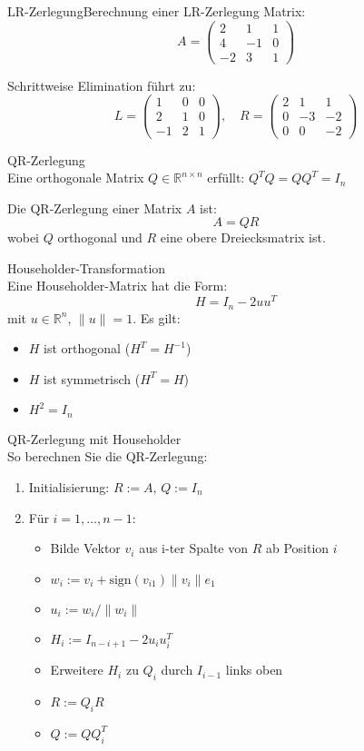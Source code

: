 \begin{example2}{LR-Zerlegung}{Berechnung einer LR-Zerlegung}
Matrix:
$$A = \begin{pmatrix}
2 & 1 & 1\\
4 & -1 & 0\\
-2 & 3 & 1
\end{pmatrix}$$

Schrittweise Elimination führt zu:
$$L = \begin{pmatrix}
1 & 0 & 0\\
2 & 1 & 0\\
-1 & 2 & 1
\end{pmatrix}, \quad
R = \begin{pmatrix}
2 & 1 & 1\\
0 & -3 & -2\\
0 & 0 & -2
\end{pmatrix}$$
\end{example2}

\begin{concept}{QR-Zerlegung}\\
Eine orthogonale Matrix $Q \in \mathbb{R}^{n\times n}$ erfüllt: $Q^T Q = QQ^T = I_n$

Die QR-Zerlegung einer Matrix $A$ ist:
$$A = QR$$
wobei $Q$ orthogonal und $R$ eine obere Dreiecksmatrix ist.
\end{concept}

\begin{definition}{Householder-Transformation}\\
Eine Householder-Matrix hat die Form:
$$H = I_n - 2uu^T$$
mit $u \in \mathbb{R}^n$, $\|u\| = 1$. Es gilt:
\begin{itemize}
    \item $H$ ist orthogonal ($H^T = H^{-1}$)
    \item $H$ ist symmetrisch ($H^T = H$)
    \item $H^2 = I_n$
\end{itemize}
\end{definition}

\begin{KR}{QR-Zerlegung mit Householder}\\
So berechnen Sie die QR-Zerlegung:
\begin{enumerate}
    \item Initialisierung: $R := A$, $Q := I_n$
    \item Für $i = 1,\ldots,n-1$:
        \begin{itemize}
            \item Bilde Vektor $v_i$ aus i-ter Spalte von $R$ ab Position $i$
            \item $w_i := v_i + \text{sign}(v_{i1})\|v_i\|e_1$
            \item $u_i := w_i/\|w_i\|$
            \item $H_i := I_{n-i+1} - 2u_iu_i^T$
            \item Erweitere $H_i$ zu $Q_i$ durch $I_{i-1}$ links oben
            \item $R := Q_iR$
            \item $Q := QQ_i^T$
        \end{itemize}
\end{enumerate}
\end{KR}

